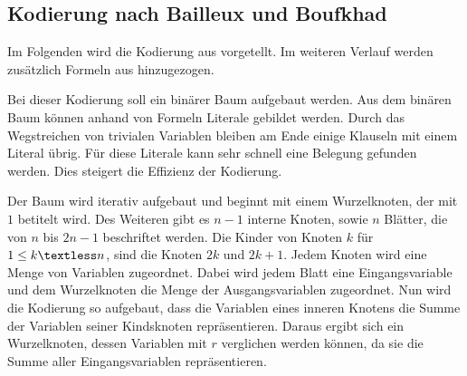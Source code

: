 \documentclass[a4,abstract=on]{scrartcl}
\begin{document}
	\subsection{Kodierung nach Bailleux und Boufkhad}
Im Folgenden wird die Kodierung aus \cite[][]{bailleux} vorgetellt. Im weiteren Verlauf werden zusätzlich Formeln aus \cite[][]{knuth} hinzugezogen.

Bei dieser Kodierung soll ein binärer Baum aufgebaut werden. Aus dem binären Baum können anhand von Formeln Literale gebildet werden. Durch das Wegstreichen von trivialen Variablen bleiben am Ende einige Klauseln mit einem Literal übrig. Für diese Literale kann sehr schnell eine Belegung gefunden werden. Dies steigert die Effizienz der Kodierung.

Der Baum wird iterativ aufgebaut und beginnt mit einem Wurzelknoten, der mit $1$ betitelt wird. Des Weiteren gibt es $n-1$ interne Knoten, sowie $n$ Blätter, die von $n$ bis $2n-1$ beschriftet werden. Die Kinder von Knoten $k$  für $1 \leq k \textless n$, sind die Knoten $2k$ und $2k +1$.
Jedem Knoten wird eine Menge von Variablen zugeordnet. Dabei wird jedem Blatt eine Eingangsvariable und dem Wurzelknoten die Menge der Ausgangsvariablen zugeordnet. Nun wird die Kodierung so aufgebaut, dass die Variablen eines inneren Knotens die Summe der Variablen seiner Kindsknoten repräsentieren. Daraus ergibt sich ein Wurzelknoten, dessen Variablen mit $r$ verglichen werden können, da sie die Summe aller Eingangsvariablen repräsentieren.\\
\end{document}
